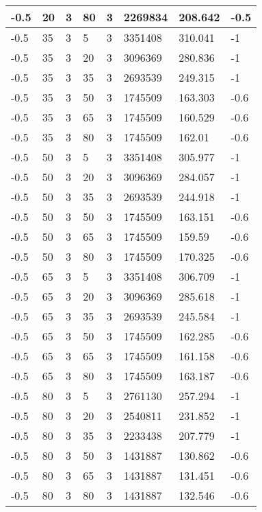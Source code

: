 \begin{longtable}{|p{1.4cm}|p{1.4cm}|p{1.4cm}|p{1.4cm}|p{1.4cm}|p{1.4cm}|p{1.4cm}|p{1.5cm}|}
        -0.5 & 20 & 3 & 80 & 3 & 2269834 & 208.642 & -0.5 \\ \hline
        -0.5 & 35 & 3 & 5 & 3 & 3351408 & 310.041 & -1 \\ \hline
        -0.5 & 35 & 3 & 20 & 3 & 3096369 & 280.836 & -1 \\ \hline
        -0.5 & 35 & 3 & 35 & 3 & 2693539 & 249.315 & -1 \\ \hline
        -0.5 & 35 & 3 & 50 & 3 & 1745509 & 163.303 & -0.6 \\ \hline
        -0.5 & 35 & 3 & 65 & 3 & 1745509 & 160.529 & -0.6 \\ \hline
        -0.5 & 35 & 3 & 80 & 3 & 1745509 & 162.01 & -0.6 \\ \hline
        -0.5 & 50 & 3 & 5 & 3 & 3351408 & 305.977 & -1 \\ \hline
        -0.5 & 50 & 3 & 20 & 3 & 3096369 & 284.057 & -1 \\ \hline
        -0.5 & 50 & 3 & 35 & 3 & 2693539 & 244.918 & -1 \\ \hline
        -0.5 & 50 & 3 & 50 & 3 & 1745509 & 163.151 & -0.6 \\ \hline
        -0.5 & 50 & 3 & 65 & 3 & 1745509 & 159.59 & -0.6 \\ \hline
        -0.5 & 50 & 3 & 80 & 3 & 1745509 & 170.325 & -0.6 \\ \hline
        -0.5 & 65 & 3 & 5 & 3 & 3351408 & 306.709 & -1 \\ \hline
        -0.5 & 65 & 3 & 20 & 3 & 3096369 & 285.618 & -1 \\ \hline
        -0.5 & 65 & 3 & 35 & 3 & 2693539 & 245.584 & -1 \\ \hline
        -0.5 & 65 & 3 & 50 & 3 & 1745509 & 162.285 & -0.6 \\ \hline
        -0.5 & 65 & 3 & 65 & 3 & 1745509 & 161.158 & -0.6 \\ \hline
        -0.5 & 65 & 3 & 80 & 3 & 1745509 & 163.187 & -0.6 \\ \hline
        -0.5 & 80 & 3 & 5 & 3 & 2761130 & 257.294 & -1 \\ \hline
        -0.5 & 80 & 3 & 20 & 3 & 2540811 & 231.852 & -1 \\ \hline
        -0.5 & 80 & 3 & 35 & 3 & 2233438 & 207.779 & -1 \\ \hline
        -0.5 & 80 & 3 & 50 & 3 & 1431887 & 130.862 & -0.6 \\ \hline
        -0.5 & 80 & 3 & 65 & 3 & 1431887 & 131.451 & -0.6 \\ \hline
        -0.5 & 80 & 3 & 80 & 3 & 1431887 & 132.546 & -0.6 \\ \hline

\end{longtable}
